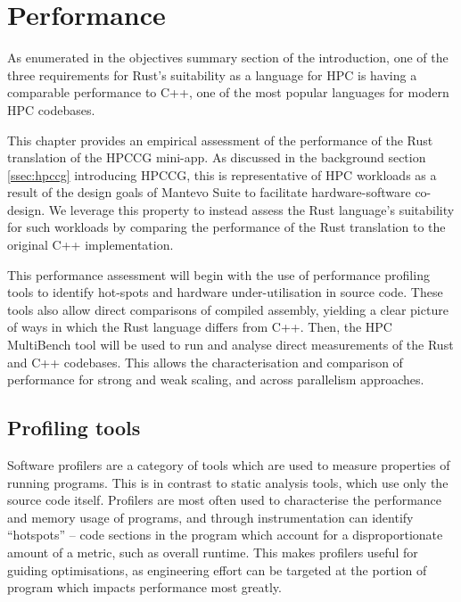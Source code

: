 \chapter{Performance}
\label{ch:performance}


As enumerated in the objectives summary section of the introduction, one of the three requirements for Rust's suitability as a language for \acrshort{HPC} is having a comparable performance to C++, one of the most popular languages for modern \acrshort{HPC} codebases.

This chapter provides an empirical assessment of the performance of the Rust translation of the \acrshort{HPCCG} \acrshort{mini-app}. As discussed in the background section \ref{ssec:hpccg} introducing \acrshort{HPCCG}, this is representative of \acrshort{HPC} workloads as a result of the design goals of Mantevo Suite to facilitate hardware-software co-design. We leverage this property to instead assess the Rust language's suitability for such workloads by comparing the performance of the Rust translation to the original C++ implementation.

This performance assessment will begin with the use of performance profiling tools to identify hot-spots and hardware under-utilisation in source code. These tools also allow direct comparisons of compiled assembly, yielding a clear picture of ways in which the Rust language differs from C++. Then, the HPC MultiBench tool will be used to run and analyse direct measurements of the Rust and C++ codebases. This allows the characterisation and comparison of performance for strong and weak scaling, and across parallelism approaches.

\section{Profiling tools}
\label{sec:profiling-tools}

Software profilers are a category of tools which are used to measure properties of running programs. This is in contrast to static analysis tools, which use only the source code itself. Profilers are most often used to characterise the performance and memory usage of programs, and through instrumentation can identify ``hotspots'' -- code sections in the program which account for a disproportionate amount of a metric, such as overall runtime. This makes profilers useful for guiding optimisations, as engineering effort can be targeted at the portion of program which impacts performance most greatly.

